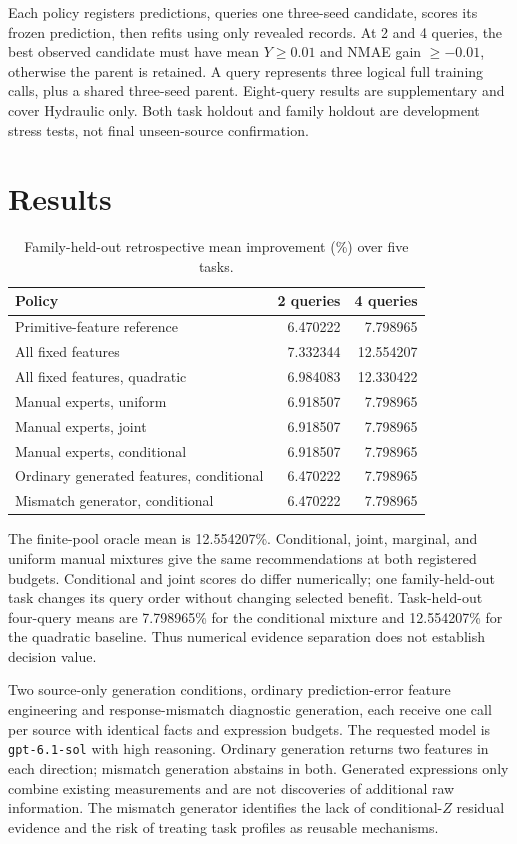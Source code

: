 \documentclass[10pt]{article}
\begin{document}
Each policy registers predictions, queries one three-seed candidate, scores its frozen prediction, then refits using only revealed records.
At 2 and 4 queries, the best observed candidate must have mean $Y\geq0.01$ and NMAE gain $\geq-0.01$, otherwise the parent is retained.
A query represents three logical full training calls, plus a shared three-seed parent.
Eight-query results are supplementary and cover Hydraulic only.
Both task holdout and family holdout are development stress tests, not final unseen-source confirmation.

\section{Results}
\begin{table}[h]
\centering
\caption{Family-held-out retrospective mean improvement (\%) over five tasks.}
\begin{tabular}{lrr}
\toprule
Policy & 2 queries & 4 queries\\
\midrule
Primitive-feature reference & 6.470222 & 7.798965\\
All fixed features & 7.332344 & 12.554207\\
All fixed features, quadratic & 6.984083 & 12.330422\\
Manual experts, uniform & 6.918507 & 7.798965\\
Manual experts, joint & 6.918507 & 7.798965\\
Manual experts, conditional & 6.918507 & 7.798965\\
Ordinary generated features, conditional & 6.470222 & 7.798965\\
Mismatch generator, conditional & 6.470222 & 7.798965\\
\bottomrule
\end{tabular}
\end{table}
The finite-pool oracle mean is 12.554207\%.
Conditional, joint, marginal, and uniform manual mixtures give the same recommendations at both registered budgets.
Conditional and joint scores do differ numerically; one family-held-out task changes its query order without changing selected benefit.
Task-held-out four-query means are 7.798965\% for the conditional mixture and 12.554207\% for the quadratic baseline.
Thus numerical evidence separation does not establish decision value.

Two source-only generation conditions, ordinary prediction-error feature engineering and response-mismatch diagnostic generation, each receive one call per source with identical facts and expression budgets.
The requested model is \texttt{gpt-6.1-sol} with high reasoning.
Ordinary generation returns two features in each direction; mismatch generation abstains in both.
Generated expressions only combine existing measurements and are not discoveries of additional raw information.
The mismatch generator identifies the lack of conditional-$Z$ residual evidence and the risk of treating task profiles as reusable mechanisms.
\end{document}
